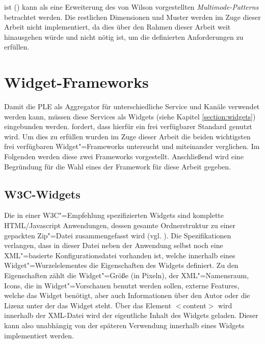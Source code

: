 ist () kann als eine Erweiterung des von Wilson vorgestellten \emph{Multimode-Patterns} betrachtet werden.   
Die restlichen Dimensionen und Muster werden im Zuge dieser Arbeit nicht implementiert, da dies über den Rahmen dieser Arbeit weit hinausgehen würde und nicht nötig ist, um die definierten Anforderungen zu erfüllen.

\section{Widget-Frameworks}\label{section:widget_frameworks}
Damit die \ac{PLE} als Aggregator für unterschiedliche Service und Kanäle verwendet werden kann, müssen diese Services als Widgets (siehe Kapitel \ref{section:widgets}) eingebunden werden.  fordert, dass hierfür ein frei verfügbarer Standard genutzt wird. Um dies zu erfüllen wurden im Zuge dieser Arbeit die beiden wichtigsten frei verfügbaren Widget"=Frameworks untersucht und miteinander verglichen. Im Folgenden werden diese zwei Frameworks vorgestellt. Anschließend wird eine Begründung für die Wahl eines der Framework für diese Arbeit gegeben.

\subsection{\ac{W3C}-Widgets}\label{section:w3c_widgets}
Die in einer \ac{W3C}"=Empfehlung spezifizierten Widgets sind komplette \ac{HTML}/Javascript Anwendungen, dessen gesamte Ordnerstruktur zu einer gepackten Zip"=Datei zusammengefasst wird (vgl. \cite{W3C-11-2012}). Die Spezifikationen verlangen, dass in dieser Datei neben der Anwendung selbst noch eine \ac{XML}"=basierte Konfigurationsdatei vorhanden ist, welche innerhalb eines Widget"=Wurzelelementes die Eigenschaften des Widgets definiert. Zu den Eigenschaften zählt die Widget"=Größe (in Pixeln), der \ac{XML}"=Namensraum, Icons, die in Widget"=Vorschauen benutzt werden sollen, externe Features, welche das Widget benötigt, aber auch Informationen über den Autor oder die Lizenz unter der das Widget steht. Über das Element $<$content$>$ wird innerhalb der \ac{XML}-Datei wird der eigentliche Inhalt des Widgets geladen. Dieser kann also unabhängig von der späteren Verwendung innerhalb eines Widgets implementiert werden.

